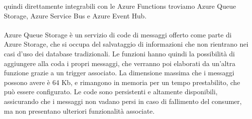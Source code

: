 quindi direttamente integrabili con le Azure Functions troviamo
Azure Queue Storage, Azure Service Bus e Azure Event Hub.\\
\\
Azure Queue Storage è un servizio di code di messaggi
offerto come parte di Azure Storage,
che si occupa del salvataggio di informazioni
che non rientrano nei casi d'uso dei database tradizionali.
Le funzioni hanno quindi la possibilità di aggiungere alla coda i propri messaggi,
che verranno poi elaborati da un'altra funzione grazie a un trigger associato.
La dimensione massima che i messaggi possono avere è 64 Kb,
e rimangono in memoria per un tempo prestabilito, che può essere configurato.
Le code sono persistenti e altamente disponibili,
assicurando che i messaggi non vadano persi in caso di fallimento del consumer,
ma non presentano ulteriori funzionalità associate.
\clearpage

